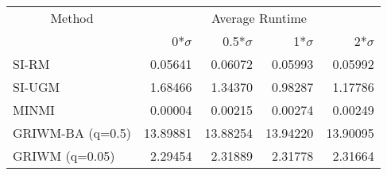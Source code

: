 
\begin{tabular}{lrrrr}
\toprule
\multicolumn{1}{c}{Method} & \multicolumn{4}{c}{Average Runtime} \\
 & 0*$\sigma$ & 0.5*$\sigma$ & 1*$\sigma$ & 2*$\sigma$\\
\midrule
SI-RM & 0.05641 & 0.06072 & 0.05993 & 0.05992\\
SI-UGM & 1.68466 & 1.34370 & 0.98287 & 1.17786\\
MINMI & 0.00004 & 0.00215 & 0.00274 & 0.00249\\
GRIWM-BA (q=0.5) & 13.89881 & 13.88254 & 13.94220 & 13.90095\\
GRIWM (q=0.05) & 2.29454 & 2.31889 & 2.31778 & 2.31664\\
\bottomrule
\end{tabular}

